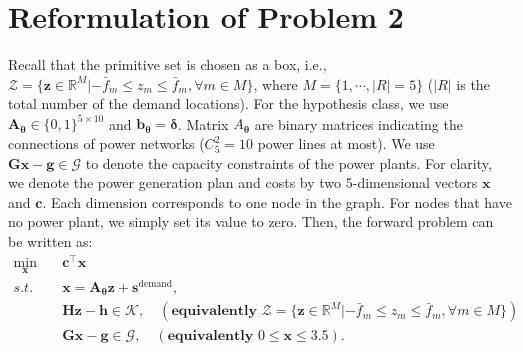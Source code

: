 \documentclass{article}
\def\x{\bm{x}}
\def\R{\mathbb{R}}
\def\s{\bm{s}}
\def\c{\bm{c}}
\def\z{\bm{z}}
\theoremstyle{plain}
\begin{document}
\section{Reformulation of Problem 2} \label{app:flow}
Recall that the primitive set is chosen as a box, i.e., $\mathcal{Z} = \{\bm{z} \in \R^{M} |  -\bar{f}_m \leq z_m \leq \bar{f}_m, \forall m \in M\}$, where $M = \{1,\cdots,|R|=5\}$ ($|R|$ is the total number of the demand locations). For the hypothesis class, we use $\bm A_{\bm \theta} \in \{0,1\}^{5 \times 10}$ and $\bm b_{\bm \theta} = \bm \delta$. Matrix $A_{\bm \theta}$ are  binary matrices indicating the connections of power networks ($C_5^2 = 10$ power lines at most).
We use $\bm G \bm x -\bm g \in \mathcal{G}$ to denote the capacity constraints of the power plants. For clarity, we denote the power generation plan and costs by two $5$-dimensional vectors $\x$ and $\c$. Each dimension corresponds to one node in the graph. For nodes that have no power plant, we simply set its value to zero. Then, the forward problem can be written as:
\begin{equation}
    \begin{aligned}
        \min_{\x} \quad &\c^\top\x \\
        s.t. \quad & \x = \bm A_{\bm \theta} \z + \s^{\text{demand}},\\
        & \bm H \z - \bm h \in \mathcal{K}, \quad (\textbf{equivalently } \mathcal{Z} = \{\bm{z} \in \R^{M} |  -\bar{f}_m \leq z_m \leq \bar{f}_m, \forall m \in M\})\\
        & \bm G \x - \bm g \in \mathcal{G}, \quad (\textbf{equivalently } 0 \leq \x \leq 3.5).
    \end{aligned}
\end{equation}
\end{document}
